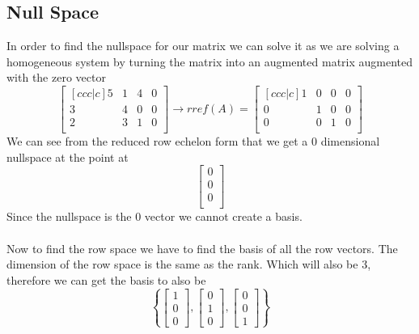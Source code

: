 \documentclass[12pt]{article}
\begin{document}
\subsection{Null Space}
In order to find the nullspace for our matrix we can solve it as we are solving a homogeneous system by turning the matrix into an augmented matrix augmented with the zero vector
\begin{equation*}
\begin{bmatrix}[ccc|c]
5 & 1 & 4 & 0\\
3 & 4 & 0 & 0\\
2 & 3 & 1 & 0 \\
\end{bmatrix}
\rightarrow
rref(A) = \begin{bmatrix}[ccc|c]
1 & 0 & 0 & 0\\
0 & 1 & 0 & 0\\
0 & 0 & 1 & 0 \\
\end{bmatrix}
\end{equation*}
We can see from the reduced row echelon form that we get a 0 dimensional nullspace at the point at 
\begin{equation*}
\begin{bmatrix}
 0\\
 0\\
 0 \\
\end{bmatrix}
\end{equation*}
Since the nullspace is the 0 vector we cannot create a basis.
\\\\ Now to find the row space we have to find the basis of all the row vectors. The dimension of the row space is the same as the rank. Which will also be 3, therefore we can get the basis to also be
\begin{equation*}\left\{\begin{bmatrix}1 \\ 0 \\ 0  \end{bmatrix},\begin{bmatrix}0 \\ 1 \\ 0  \end{bmatrix},\begin{bmatrix}0 \\ 0 \\ 1  \end{bmatrix}\right\}\end{equation*}
\end{document}
